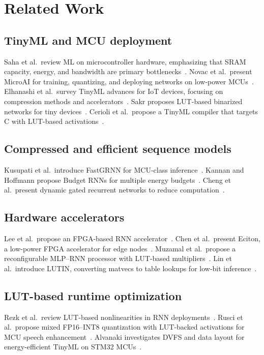 \documentclass[lettersize,journal]{IEEEtran}
\begin{document}
\section{Related Work}
\label{sec:related_work}

\subsection{TinyML and MCU deployment}
Saha et al.\ review ML on microcontroller hardware, emphasizing that SRAM
capacity, energy, and bandwidth are primary bottlenecks~\cite{Saha2022}.
Novac et al.\ present MicroAI for training, quantizing, and deploying networks
on low-power MCUs~\cite{Novac2021}.
Elhanashi et al.\ survey TinyML advances for IoT devices, focusing on
compression methods and accelerators~\cite{Elhanashi2024}.
Sakr proposes LUT-based binarized networks for tiny devices~\cite{Sakr2023}.
Cerioli et al.\ propose a TinyML compiler that targets C with LUT-based
activations~\cite{Cerioli2025}.

\subsection{Compressed and efficient sequence models}
Kusupati et al.\ introduce FastGRNN for MCU-class
inference~\cite{Kusupati2018}.
Kannan and Hoffmann propose Budget RNNs for multiple energy
budgets~\cite{Kannan2021}.
Cheng et al.\ present dynamic gated recurrent networks to reduce
computation~\cite{Cheng2024}.

\subsection{Hardware accelerators}
Lee et al.\ propose an FPGA-based RNN accelerator~\cite{Lee2021}.
Chen et al.\ present Eciton, a low-power FPGA accelerator for edge
nodes~\cite{Chen2024}.
Muzamal et al.\ propose a reconfigurable MLP--RNN processor with LUT-based
multipliers~\cite{Muzamal2021}.
Lin et al.\ introduce LUTIN, converting matvecs to table lookups for low-bit
inference~\cite{Lin2024}.

\subsection{LUT-based runtime optimization}
Rezk et al.\ review LUT-based nonlinearities in RNN
deployments~\cite{Rezk2020}.
Rusci et al.\ propose mixed FP16--INT8 quantization with LUT-backed activations
for MCU speech enhancement~\cite{Rusci2022}.
Alvanaki investigates DVFS and data layout for energy-efficient TinyML on
STM32 MCUs~\cite{Alvanaki2024}.
\end{document}
